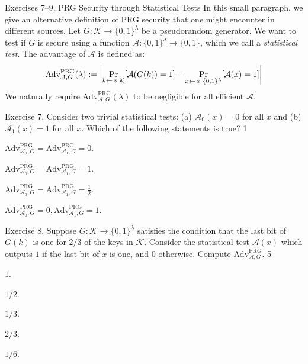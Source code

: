 \documentclass[../../book.tex]{subfiles}
\begin{document}
\begin{exbox}{Exercises 7--9. PRG Security through Statistical Tests}
In this small paragraph, we give an alternative definition of PRG security that one might encounter in different sources. 
Let $G: \mathcal{K} \to \{0,1\}^{\lambda}$ be a pseudorandom generator. We want to test if $G$ is secure using a function $\mathcal{A}: \{0,1\}^{\lambda} \to \{0,1\}$, which we call a \textit{statistical test}. The advantage of $\mathcal{A}$ is defined as:
\begin{equation*}
    \text{Adv}^{\text{PRG}}_{\mathcal{A},G}(\lambda) := \left|\underset{k \leftarrowS \mathcal{K}}{\text{Pr}}[\mathcal{A}(G(k))=1] - \underset{x \leftarrowS \{0,1\}^{\lambda}}{\text{Pr}}[\mathcal{A}(x)=1]\right|
\end{equation*}
We naturally require $\text{Adv}^{\text{PRG}}_{\mathcal{A},G}(\lambda)$ to be negligible for all efficient $\mathcal{A}$.
\end{exbox}

\begin{xexercise}
    {Exercise 7.}
    {Consider two trivial statistical tests: (a) $\mathcal{A}_0(x)=0$ for all 
    $x$ and (b) $\mathcal{A}_1(x)=1$ for all $x$. Which of the following statements is true?}
    {1}
    {
        \item $\text{Adv}^{\text{PRG}}_{\mathcal{A}_0,G} = \text{Adv}^{\text{PRG}}_{\mathcal{A}_1,G} = 0$.
        \item $\text{Adv}^{\text{PRG}}_{\mathcal{A}_0,G} = \text{Adv}^{\text{PRG}}_{\mathcal{A}_1,G} = 1$.
        \item $\text{Adv}^{\text{PRG}}_{\mathcal{A}_0,G} = \text{Adv}^{\text{PRG}}_{\mathcal{A}_1,G} = \frac{1}{2}$.
        \item $\text{Adv}^{\text{PRG}}_{\mathcal{A}_0,G} = 0, \text{Adv}^{\text{PRG}}_{\mathcal{A}_1,G} = 1$.
    }
\end{xexercise}

\begin{xexercise}
    {Exercise 8.}
    {Suppose $G: \mathcal{K} \to \{0,1\}^{\lambda}$ satisfies the condition that the last bit of $G(k)$ is one for $2/3$ of the keys in $\mathcal{K}$. Consider the statistical test $\mathcal{A}(x)$ which outputs $1$ if the last bit of $x$ is one, and $0$ otherwise. Compute $\text{Adv}^{\text{PRG}}_{\mathcal{A},G}$.}
    {5}
    {
        \item $1$.
        \item $1/2$.
        \item $1/3$.
        \item $2/3$.
        \item $1/6$.
    }
\end{xexercise}
\end{document}
